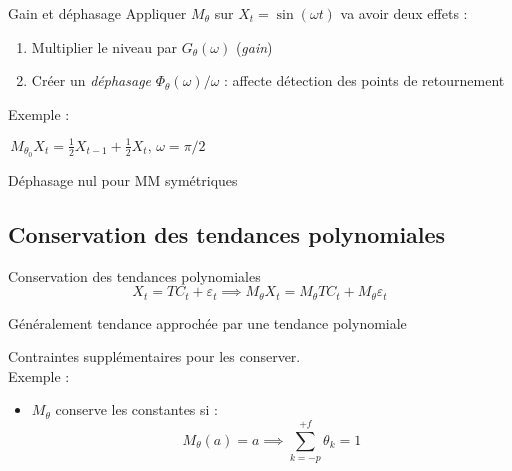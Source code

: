 \documentclass[10pt,xcolor=table,color={dvipsnames,usenames},ignorenonframetext,usepdftitle=false,french]{beamer}
\providecommand{\tightlist}{%
  \setlength{\parskip}{0pt}
  }
\newcommand\1{\mathds{1}}
\begin{document}
\begin{frame}{Gain et déphasage}
\protect\hypertarget{gain-et-duxe9phasage-1}{}
Appliquer \(M_\theta\) sur \(X_t=\sin(\omega t)\) va avoir deux effets :

\begin{enumerate}
\tightlist
\item
  Multiplier le niveau par \(G_{\theta}\left(\omega\right)\)
  (\emph{gain})\\
\item
  Créer un \emph{déphasage} \(\Phi_\theta(\omega)/\omega\) : affecte
  détection des points de retournement
\end{enumerate}

Exemple :

\(\,M_{\theta_0}X_t=\frac{1}{2}X_{t-1}+\frac{1}{2}X_{t},\,\omega=\pi/2\)

\begin{figure}[!ht]
\end{figure}

\pause

\faArrowCircleRight{} Déphasage nul pour MM symétriques
\end{frame}

\hypertarget{conservation-des-tendances-polynomiales}{%
\subsection{Conservation des tendances
polynomiales}\label{conservation-des-tendances-polynomiales}}

\begin{frame}{Conservation des tendances polynomiales}
\protect\hypertarget{conservation-des-tendances-polynomiales-1}{}
\[
X_t=TC_t+\varepsilon_t\implies M_\theta X_t =M_\theta TC_t+M_\theta \varepsilon_t
\]

Généralement tendance approchée par une tendance polynomiale

\faArrowCircleRight{} Contraintes supplémentaires pour les conserver.\\
\pause Exemple :

\begin{itemize}
\tightlist
\item
  \(M_\theta\) conserve les constantes si : \[
  M_\theta(a)=a\implies \sum_{k=-p}^{+f}\theta_k = 1
  \]
\end{itemize}
\end{frame}
\end{document}
